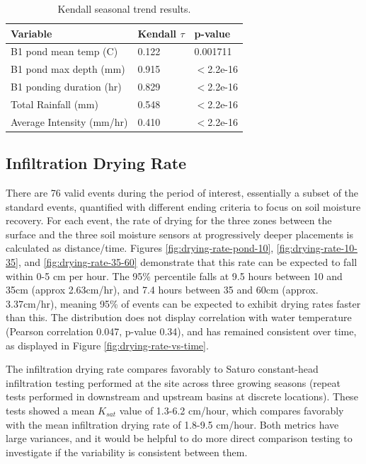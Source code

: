 \begin{table}[ht!]
	\centering
	\caption{Kendall seasonal trend results.}
	\begin{tabular}{|l|l|l|}
		\hline
		Variable & Kendall $\tau$ & p-value \\
		\hline
		B1 pond mean temp (\degree C) & 0.122 & 0.001711 \\
		B1 pond max depth (mm)        & 0.915 & $<$2.2e-16 \\
		B1 ponding duration (hr)      & 0.829 & $<$2.2e-16 \\
		Total Rainfall (mm)           & 0.548 & $<$2.2e-16 \\
		Average Intensity (mm/hr)     & 0.410 & $<$2.2e-16 \\
		\hline
	\end{tabular}
	\label{table:kendall-test-results}
\end{table}

\subsection{Infiltration Drying Rate}

There are 76 valid events during the period of interest, essentially a subset of the standard events, quantified with different ending criteria to focus on soil moisture recovery.
For each event, the rate of drying for the three zones between the surface and the three soil moisture sensors at progressively deeper placements is calculated as distance/time.
Figures \ref{fig:drying-rate-pond-10}, \ref{fig:drying-rate-10-35}, and \ref{fig:drying-rate-35-60} demonstrate that this rate can be expected to fall within 0-5 cm per hour.
The 95\% percentile falls at 9.5 hours between 10 and 35cm (approx 2.63cm/hr), and 7.4 hours between 35 and 60cm (approx. 3.37cm/hr), meaning 95\% of events can be expected to exhibit drying rates faster than this.
The distribution does not display correlation with water temperature (Pearson correlation 0.047, p-value 0.34), and has remained consistent over time, as displayed in Figure \ref{fig:drying-rate-vs-time}.

The infiltration drying rate compares favorably to Saturo constant-head infiltration testing performed at the site across three growing seasons (repeat tests performed in downstream and upstream basins at discrete locations).
These tests showed a mean $K_{sat}$ value of 1.3-6.2 cm/hour, which compares favorably with the mean infiltration drying rate of 1.8-9.5 cm/hour.
Both metrics have large variances, and it would be helpful to do more direct comparison testing to investigate if the variability is consistent between them.

